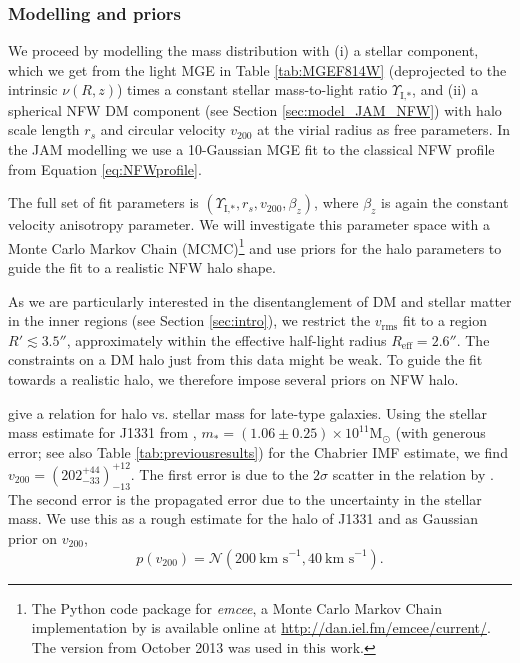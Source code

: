 \documentclass[useAMS,usenatbib]{mnras}
\begin{document}
\subsubsection{Modelling and priors}

We proceed by modelling the mass distribution with (i) a stellar component, which we get from the light MGE in Table \ref{tab:MGEF814W} (deprojected to the intrinsic $\nu(R,z)$) times a constant stellar mass-to-light ratio $\Upsilon_\text{I,*}$, and (ii) a spherical NFW DM component (see Section \ref{sec:model_JAM_NFW}) with halo scale length $r_s$ and circular velocity $v_{200}$ at the virial radius as free parameters. In the JAM modelling we use a 10-Gaussian MGE fit to the classical NFW profile from Equation \eqref{eq:NFWprofile}.

The full set of fit parameters is $(\Upsilon_\text{I,*},r_s,v_{200},\beta_z)$, where $\beta_z$ is again the constant velocity anisotropy parameter. We will investigate this parameter space with a Monte Carlo Markov Chain (MCMC)\footnote{The Python code package for \emph{emcee}, a Monte Carlo Markov Chain implementation by \citet{emcee} is available online at \url{http://dan.iel.fm/emcee/current/}. The version from October 2013 was used in this work.} \citep{emcee} and use priors for the halo parameters to guide the fit to a realistic NFW halo shape.

As we are particularly interested in the disentanglement of DM and stellar matter in the inner regions (see Section \ref{sec:intro}), we restrict the $v_\text{rms}$ fit to a region $R'\lesssim3.5''$, approximately within the effective half-light radius $R_\text{eff}=2.6''$. The constraints on a DM halo just from this data might be weak. To guide the fit towards a realistic halo, we therefore impose several priors on NFW halo.

\citet{Dutton10} give a relation for halo vs. stellar mass for late-type galaxies. Using the stellar mass estimate for J1331 from \citet{SWELLSI}, $m_* = (1.06 \pm 0.25) \times 10^{11} \text{M}_\odot$ (with generous error; see also Table \ref{tab:previousresults}) for the Chabrier IMF estimate, we find ${v_{200}} = (202_{-33}^{+44})_{-13}^{+12}$. The first error is due to the $2\sigma$ scatter in the relation by \citet{Dutton10}. The second error is the propagated error due to the uncertainty in the stellar mass. We use this as a rough estimate for the halo of J1331 and as Gaussian prior on $v_{200}$, 
\begin{equation}
p(v_{200}) = \mathscr{N}(200~\text{km s}^{-1},40~\text{km s}^{-1}). \label{eq:prior_v200}
\end{equation}
\end{document}
